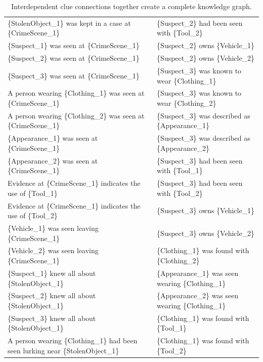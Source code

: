 \documentclass{article}
\begin{document}
\begin{landscape}
\begin{table}[]
\caption {Interdependent clue connections together create a complete knowledge graph.} \label{tab:inter_edges} 
\begin{tabular}{ll}
\{StolenObject\_1\}   was kept in a case at \{CrimeScene\_1\} & \{Suspect\_2\} had been seen with   \{Tool\_2\} \\
\{Suspect\_1\}   was seen at \{CrimeScene\_1\} & \{Suspect\_2\} owns \{Vehicle\_1\} \\
\{Suspect\_2\}   was seen at \{CrimeScene\_1\} & \{Suspect\_2\} owns \{Vehicle\_2\} \\
\{Suspect\_3\}   was seen at \{CrimeScene\_1\} & \{Suspect\_3\} was known to wear   \{Clothing\_1\} \\
A person   wearing \{Clothing\_1\} was seen at \{CrimeScene\_1\} & \{Suspect\_3\} was known to wear   \{Clothing\_2\} \\
A person   wearing \{Clothing\_2\} was seen at \{CrimeScene\_1\} & \{Suspect\_3\} was described as   \{Appearance\_1\} \\
\{Appearance\_1\}   was seen at \{CrimeScene\_1\} & \{Suspect\_3\} was described as   \{Appearance\_2\} \\
\{Appearance\_2\}   was seen at \{CrimeScene\_1\} & \{Suspect\_3\} had been seen with   \{Tool\_1\} \\
Evidence   at \{CrimeScene\_1\} indicates the use of \{Tool\_1\} & \{Suspect\_3\} had been seen with   \{Tool\_2\} \\
Evidence   at \{CrimeScene\_1\} indicates the use of \{Tool\_2\} & \{Suspect\_3\} owns \{Vehicle\_1\} \\
\{Vehicle\_1\}   was seen leaving \{CrimeScene\_1\} & \{Suspect\_3\} owns \{Vehicle\_2\} \\
\{Vehicle\_2\}   was seen leaving \{CrimeScene\_1\} & \{Clothing\_1\} was found with   \{Clothing\_2\} \\
\{Suspect\_1\}   knew all about \{StolenObject\_1\} & \{Appearance\_1\} was seen wearing   \{Clothing\_1\} \\
\{Suspect\_2\}   knew all about \{StolenObject\_1\} & \{Appearance\_2\} was seen wearing   \{Clothing\_1\} \\
\{Suspect\_3\}   knew all about \{StolenObject\_1\} & \{Clothing\_1\} was found with   \{Tool\_1\} \\
A person   wearing \{Clothing\_1\} had been seen lurking near \{StolenObject\_1\} & \{Clothing\_1\} was found with   \{Tool\_2\} \\

\end{tabular}
\end{table}
\end{landscape}
\end{document}
